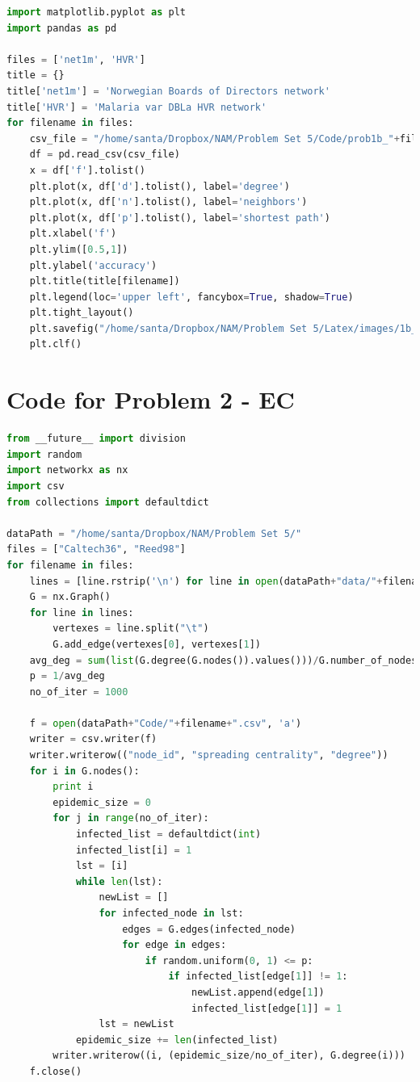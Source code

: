 \documentclass{article}
\begin{document}
\begin{lstlisting}[language=Python, breaklines=true] 
import matplotlib.pyplot as plt
import pandas as pd

files = ['net1m', 'HVR']
title = {}
title['net1m'] = 'Norwegian Boards of Directors network'
title['HVR'] = 'Malaria var DBLa HVR network'
for filename in files:
    csv_file = "/home/santa/Dropbox/NAM/Problem Set 5/Code/prob1b_"+filename+".csv"
    df = pd.read_csv(csv_file)
    x = df['f'].tolist()
    plt.plot(x, df['d'].tolist(), label='degree')
    plt.plot(x, df['n'].tolist(), label='neighbors')
    plt.plot(x, df['p'].tolist(), label='shortest path')
    plt.xlabel('f')
    plt.ylim([0.5,1])
    plt.ylabel('accuracy')
    plt.title(title[filename])
    plt.legend(loc='upper left', fancybox=True, shadow=True)
    plt.tight_layout()
    plt.savefig("/home/santa/Dropbox/NAM/Problem Set 5/Latex/images/1b_"+filename+".png")
    plt.clf()
\end{lstlisting}

\section*{Code for Problem 2 - EC}
\begin{lstlisting}[language=Python, breaklines=true] 
from __future__ import division
import random
import networkx as nx
import csv
from collections import defaultdict

dataPath = "/home/santa/Dropbox/NAM/Problem Set 5/"
files = ["Caltech36", "Reed98"]
for filename in files:
    lines = [line.rstrip('\n') for line in open(dataPath+"data/"+filename+".txt")]
    G = nx.Graph()
    for line in lines:
        vertexes = line.split("\t")
        G.add_edge(vertexes[0], vertexes[1])
    avg_deg = sum(list(G.degree(G.nodes()).values()))/G.number_of_nodes()
    p = 1/avg_deg
    no_of_iter = 1000
    
    f = open(dataPath+"Code/"+filename+".csv", 'a')
    writer = csv.writer(f)
    writer.writerow(("node_id", "spreading centrality", "degree"))
    for i in G.nodes():
        print i
        epidemic_size = 0
        for j in range(no_of_iter):
            infected_list = defaultdict(int)
            infected_list[i] = 1
            lst = [i]
            while len(lst):
                newList = []
                for infected_node in lst:
                    edges = G.edges(infected_node)
                    for edge in edges:
                        if random.uniform(0, 1) <= p:
                            if infected_list[edge[1]] != 1:
                                newList.append(edge[1])
                                infected_list[edge[1]] = 1
                lst = newList
            epidemic_size += len(infected_list)
        writer.writerow((i, (epidemic_size/no_of_iter), G.degree(i)))
    f.close()
\end{lstlisting}
\end{document}
